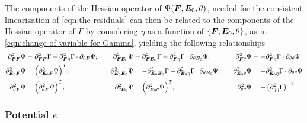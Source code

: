 The components of the Hessian operator of $\Psi(\boldsymbol{F},\boldsymbol{E}_0,\theta)$, needed for the consistent linearization of \eqref{eqn:the residuals} can then be related to the components of the Hessian operator of $\Gamma$ by considering $\eta$ as a function of $\{\boldsymbol{F},\boldsymbol{E}_0,\theta\}$, as in \eqref{eqn:change of variable for Gamma}, yielding the following relationships
%
\begin{equation}
	\begin{aligned}
		\partial^2_{\boldsymbol{F}\boldsymbol{F}}\Psi & =  \partial^2_{\boldsymbol{F}\boldsymbol{F}}\Gamma - 
		\partial^2_{\boldsymbol{F}\eta}\Gamma \cdot \partial_{\theta\boldsymbol{F}}\Psi;&\quad
		\partial^2_{\boldsymbol{F}\boldsymbol{E}_0}\Psi & = 
\partial^2_{\boldsymbol{F}\boldsymbol{E}_0}\Gamma		-\partial^2_{\boldsymbol{F}\eta}\Gamma \cdot \partial_{\theta\boldsymbol{E}_0}\Psi;&\quad
		\partial^2_{\boldsymbol{F}\theta}\Psi & = 
		-\partial^2_{\boldsymbol{F}\eta}\Gamma\cdot\partial_{\theta\theta}\Psi\\
		\partial^2_{\boldsymbol{E}_0\boldsymbol{F}}\Psi & =  \Big(\partial^2_{\boldsymbol{E}_0\boldsymbol{F}}\Psi\Big)^T;&\quad
		\partial^2_{\boldsymbol{E}_0\boldsymbol{E}_0}\Psi & = -
		\partial^2_{\boldsymbol{E}_0\boldsymbol{E}_0}\Gamma - 
		\partial^2_{\boldsymbol{E}_0\eta}\Gamma \cdot \partial_{\theta\boldsymbol{E}_0}\Psi;&\quad
		\partial^2_{\boldsymbol{E}_0\theta}\Psi & = 
		-\partial^2_{\boldsymbol{E}_0\eta}\Gamma\cdot \partial_{\theta\theta}\Psi \\
		\partial^2_{\theta\boldsymbol{F}}\Psi & =\Big(\partial^2_{\theta\boldsymbol{F}}\Psi\Big)^T;&\quad
		\partial^2_{\theta\boldsymbol{E}_0}\Psi & = \Big(		\partial^2_{\boldsymbol{E}_0\theta}\Psi\Big)^T ;&\quad
		\partial^2_{\theta\theta}\Psi & =-\left(\partial^2_{\eta\eta}\Gamma\right)^{-1}
	\end{aligned}
\end{equation}
	

\subsubsection{Potential $e$}

